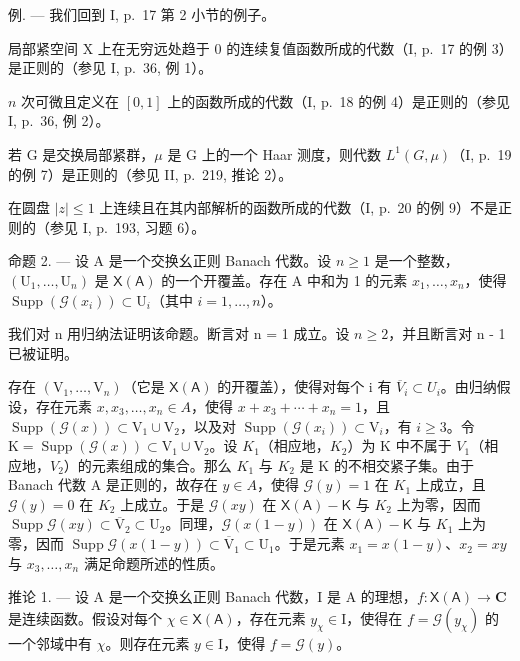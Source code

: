 例. --- 我们回到 I, p.~17 第 2 小节的例子。

局部紧空间 X 上在无穷远处趋于 0 的连续复值函数所成的代数（I, p.~17 的例 3）是正则的（参见 I, p.~36, 例 1）。

 \(n\) 次可微且定义在 \([0, 1]\) 上的函数所成的代数（I, p.~18 的例 4）是正则的（参见 I, p.~36, 例 2）。

若 G 是交换局部紧群，\(\mu\) 是 G 上的一个 Haar 测度，则代数 \(L^{1}(G,\mu)\)（I, p.~19 的例 7）是正则的（参见 II, p.~219, 推论 2）。

在圆盘 \(|z| \leqslant 1\) 上连续且在其内部解析的函数所成的代数（I, p.~20 的例 9）不是正则的（参见 I, p.~193, 习题 6）。

命题 2. --- 设 A 是一个交换幺正则 Banach 代数。设 \(n \geqslant 1\) 是一个整数，\((\mathrm{U}_{1}, \ldots, \mathrm{U}_{n})\) 是 \(\mathsf{X}(\mathsf{A})\) 的一个开覆盖。存在 A 中和为 1 的元素 \(x_{1}, \ldots, x_{n}\)，使得 \(\operatorname{Supp}(\mathcal{G}(x_{i})) \subset \mathrm{U}_{i}\)（其中 \(i = 1, \ldots, n\)）。

我们对 n 用归纳法证明该命题。断言对 n = 1 成立。设 \(n \geqslant 2\)，并且断言对 n - 1 已被证明。

存在 \((\mathrm{V}_{1},\ldots,\mathrm{V}_{n})\)（它是 \(\mathsf{X}(\mathsf{A})\) 的开覆盖），使得对每个 i 有 \(\overline{V}_{i}\subset U_{i}\)。由归纳假设，存在元素 \(x,x_{3},\ldots,x_{n}\in A\)，使得 \(x+x_{3}+\cdots+x_{n}=1\)，且 \(\operatorname{Supp}(\mathcal{G}(x))\subset\mathrm{V}_{1}\cup\mathrm{V}_{2}\)，以及对 \(\operatorname{Supp}(\mathcal{G}(x_{i}))\subset\mathrm{V}_{i}\)，有 \(i\geqslant3\)。令 \(\mathrm{K}=\operatorname{Supp}(\mathcal{G}(x))\subset\mathrm{V}_{1}\cup\mathrm{V}_{2}\)。设 \(K_{1}\)（相应地，\(K_{2}\)）为 K 中不属于 \(V_{1}\)（相应地，\(V_{2}\)）的元素组成的集合。那么 \(K_{1}\) 与 \(K_{2}\) 是 K 的不相交紧子集。由于 Banach 代数 A 是正则的，故存在 \(y\in A\)，使得 \(\mathcal{G}(y)=1\) 在 \(K_{1}\) 上成立，且 \(\mathcal{G}(y)=0\) 在 \(K_{2}\) 上成立。于是 \(\mathcal{G}(xy)\) 在 \(\mathsf{X}(\mathsf{A})-\mathsf{K}\) 与 \(K_{2}\) 上为零，因而 \(\operatorname{Supp}\mathcal{G}(xy)\subset\overline{\mathrm{V}}_{2}\subset\mathrm{U}_{2}\)。同理，\(\mathcal{G}(x(1-y))\) 在 \(\mathsf{X}(\mathsf{A})-\mathsf{K}\) 与 \(K_{1}\) 上为零，因而 \(\operatorname{Supp}\mathcal{G}(x(1-y))\subset\overline{\mathrm{V}}_{1}\subset\mathrm{U}_{1}\)。于是元素 \(x_{1}=x(1-y)\)、\(x_{2}=xy\) 与 \(x_{3},\ldots,x_{n}\) 满足命题所述的性质。

推论 1. --- 设 A 是一个交换幺正则 Banach 代数，I 是 A 的理想，\(f: \mathsf{X}(\mathsf{A}) \to \mathbf{C}\) 是连续函数。假设对每个 \(\chi \in \mathsf{X}(\mathsf{A})\)，存在元素 \(y_{\chi} \in \mathrm{I}\)，使得在 \(f = \mathcal{G}(y_{\chi})\) 的一个邻域中有 \(\chi\)。则存在元素 \(y \in \mathrm{I}\)，使得 \(f = \mathcal{G}(y)\)。

